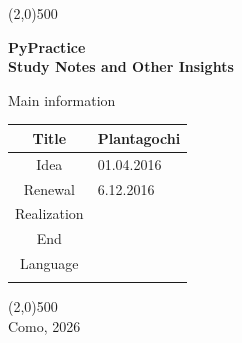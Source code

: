 \documentclass[a4paper,12pt]{article} %
\begin{document}
\begin{titlepage}

\line(2,0){500}

\vspace{30pt}

\begin{center}
{\Huge \textbf{PyPractice}}\\
\vspace{40pt}
{\huge \textbf{Study Notes and Other Insights}}\\
\end{center}

\vspace{70pt}

\begin{center}
{\large Main information}\\
\end{center}

\begin{tabularx}{\textwidth}{|c|X|}
\hline
Title & Plantagochi\\
\hline
Idea & 01.04.2016\\
\hline
Renewal & 6.12.2016\\
\hline
Realization & \\
\hline
End & \\
\hline
Language & \\
\hline
 & \\
\hline
\end{tabularx}

\vspace{\fill}
\begin{center}
\line(2,0){500}\\
Como, 2026
\end{center}

\end{titlepage}
\end{document}
